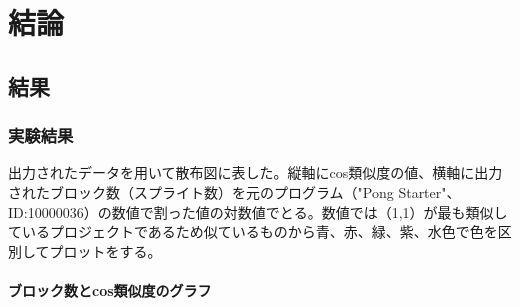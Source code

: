 \documentclass[a4paper,10pt,onecolumn,oneside,openany]{jsbook}
\begin{document}
\part{結論}
\chapter{結果}
\section{実験結果}
出力されたデータを用いて散布図に表した。縦軸にcos類似度の値、横軸に出力されたブロック数（スプライト数）を元のプログラム（"Pong Starter"、ID:10000036）の数値で割った値の対数値でとる。数値では（1,1）が最も類似しているプロジェクトであるため似ているものから青、赤、緑、紫、水色で色を区別してプロットをする。

\subsection{ブロック数とcos類似度のグラフ}
\end{document}
